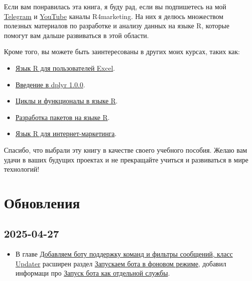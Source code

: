 \documentclass[
]{book}
\providecommand{\tightlist}{%
  \setlength{\itemsep}{0pt}\setlength{\parskip}{0pt}}
\begin{document}
Если вам понравилась эта книга, я буду рад, если вы подпишетесь на мой \href{https://t.me/R4marketing}{Telegram} и \href{https://www.youtube.com/R4marketing/?sub_confirmation=1}{YouTube} каналы R4marketing. На них я делюсь множеством полезных материалов по разработке и анализу данных на языке R, которые помогут вам дальше развиваться в этой области.

Кроме того, вы можете быть заинтересованы в других моих курсах, таких как:

\begin{itemize}
\tightlist
\item
  \href{https://selesnow.github.io/r4excel_users/}{Язык R для пользователей Excel}.
\item
  \href{https://selesnow.github.io/dplyr_1_0_0_course/}{Введение в dplyr 1.0.0}.
\item
  \href{https://selesnow.github.io/iterations_in_r/}{Циклы и функционалы в языке R}.
\item
  \href{https://selesnow.github.io/r_package_course/}{Разработка пакетов на языке R}.
\item
  \href{https://www.youtube.com/playlist?list=PLD2LDq8edf4o6dSZ4BIr7J08gT97nimH_}{Язык R для интернет-маркетинга}.
\end{itemize}

Спасибо, что выбрали эту книгу в качестве своего учебного пособия. Желаю вам удачи в ваших будущих проектах и не прекращайте учиться и развиваться в мире технологий!

{}

\chapter*{Обновления}\label{ux43eux431ux43dux43eux432ux43bux435ux43dux438ux44f}

\section*{2025-04-27}\label{section}

\begin{itemize}
\tightlist
\item
  В главе \hyperref[ux434ux43eux431ux430ux432ux43bux44fux435ux43c-ux431ux43eux442ux443-ux43fux43eux434ux434ux435ux440ux436ux43aux443-ux43aux43eux43cux430ux43dux434-ux438-ux444ux438ux43bux44cux442ux440ux44b-ux441ux43eux43eux431ux449ux435ux43dux438ux439-ux43aux43bux430ux441ux441-updater]{Добавляем боту поддержку команд и фильтры сообщений, класс Updater} расширен раздел \hyperref[ux437ux430ux43fux443ux441ux43aux430ux435ux43c-ux431ux43eux442ux430-ux432-ux444ux43eux43dux43eux432ux43eux43c-ux440ux435ux436ux438ux43cux435]{Запускаем бота в фоновом режиме}, добавил информаци про \hyperref[ux437ux430ux43fux443ux441ux43a-ux431ux43eux442ux430-ux43aux430ux43a-ux43eux442ux434ux435ux43bux44cux43dux43eux439-ux441ux43bux443ux436ux431ux44b]{Запуск бота как отдельной службы}.
\end{itemize}
\end{document}
